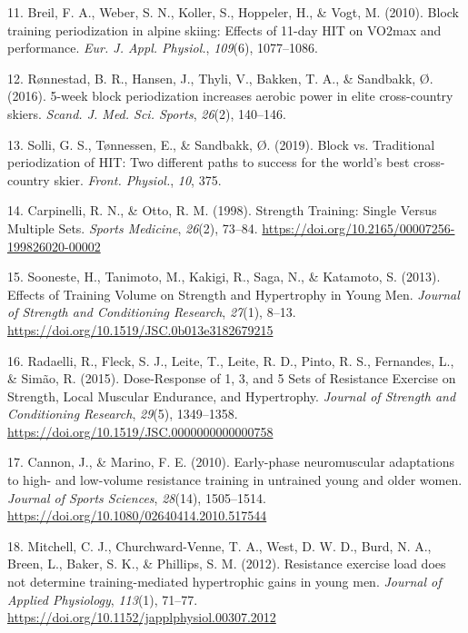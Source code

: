 \documentclass[
  letterpaper,
  DIV=11,
  numbers=noendperiod]{scrreprt}
\newlength{\cslhangindent}
\newenvironment{CSLReferences}[2] %
 {\begin{list}{}{%
  \setlength{\itemindent}{0pt}
  \setlength{\leftmargin}{0pt}
  \setlength{\parsep}{0pt}
  \ifodd #1
   \setlength{\leftmargin}{\cslhangindent}
   \setlength{\itemindent}{-1\cslhangindent}
  \fi
  \setlength{\itemsep}{#2\baselineskip}}}
 {\end{list}}
\begin{document}
\begin{CSLReferences}{1}{0}
11. Breil, F. A., Weber, S. N., Koller, S., Hoppeler, H., \& Vogt, M.
(2010). Block training periodization in alpine skiing: Effects of 11-day
{HIT} on {VO2max} and performance. \emph{Eur. J. Appl. Physiol.},
\emph{109}(6), 1077--1086.

12. Rønnestad, B. R., Hansen, J., Thyli, V., Bakken, T. A., \& Sandbakk,
Ø. (2016). 5-week block periodization increases aerobic power in elite
cross-country skiers. \emph{Scand. J. Med. Sci. Sports}, \emph{26}(2),
140--146.

13. Solli, G. S., Tønnessen, E., \& Sandbakk, Ø. (2019). Block vs.
Traditional periodization of {HIT}: Two different paths to success for
the world's best cross-country skier. \emph{Front. Physiol.}, \emph{10},
375.

14. Carpinelli, R. N., \& Otto, R. M. (1998). Strength Training: Single
Versus Multiple Sets. \emph{Sports Medicine}, \emph{26}(2), 73--84.
\url{https://doi.org/10.2165/00007256-199826020-00002}

15. Sooneste, H., Tanimoto, M., Kakigi, R., Saga, N., \& Katamoto, S.
(2013). Effects of Training Volume on Strength and Hypertrophy in Young
Men. \emph{Journal of Strength and Conditioning Research}, \emph{27}(1),
8--13. \url{https://doi.org/10.1519/JSC.0b013e3182679215}

16. Radaelli, R., Fleck, S. J., Leite, T., Leite, R. D., Pinto, R. S.,
Fernandes, L., \& Simão, R. (2015). Dose-Response of 1, 3, and 5 Sets of
Resistance Exercise on Strength, Local Muscular Endurance, and
Hypertrophy. \emph{Journal of Strength and Conditioning Research},
\emph{29}(5), 1349--1358.
\url{https://doi.org/10.1519/JSC.0000000000000758}

17. Cannon, J., \& Marino, F. E. (2010). Early-phase neuromuscular
adaptations to high- and low-volume resistance training in untrained
young and older women. \emph{Journal of Sports Sciences}, \emph{28}(14),
1505--1514. \url{https://doi.org/10.1080/02640414.2010.517544}

18. Mitchell, C. J., Churchward-Venne, T. A., West, D. W. D., Burd, N.
A., Breen, L., Baker, S. K., \& Phillips, S. M. (2012). Resistance
exercise load does not determine training-mediated hypertrophic gains in
young men. \emph{Journal of Applied Physiology}, \emph{113}(1), 71--77.
\url{https://doi.org/10.1152/japplphysiol.00307.2012}


\end{CSLReferences}
\end{document}

